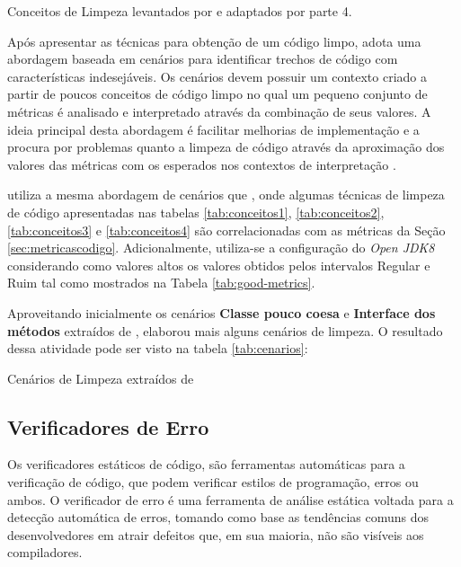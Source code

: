 \begin{table}[!ht]
\centering

\caption{Conceitos de Limpeza levantados por  e adaptados por  parte 4.} 
\label{tab:conceitos4}
\end{table}
\FloatBarrier

Após apresentar as técnicas para obtenção de um código limpo,    adota uma abordagem baseada em cenários para identificar trechos de código com características indesejáveis. Os cenários devem possuir um contexto criado a partir de poucos conceitos de código limpo no qual um pequeno conjunto de métricas é analisado e interpretado através da combinação de seus valores. A ideia principal desta abordagem é facilitar melhorias de implementação e a procura por problemas quanto a limpeza de código através da aproximação dos valores das métricas com os esperados nos contextos de interpretação \cite{Machini2010}.

 utiliza a mesma abordagem de cenários que , onde algumas técnicas de limpeza de código apresentadas nas tabelas \ref{tab:conceitos1}, \ref{tab:conceitos2}, \ref{tab:conceitos3} e \ref{tab:conceitos4} são correlacionadas com as métricas da Seção \ref{sec:metricascodigo}. Adicionalmente, utiliza-se a configuração do \textit{ Open JDK8 } considerando como valores altos os valores obtidos pelos intervalos Regular e Ruim tal como mostrados na Tabela \ref{tab:good-metrics}.

Aproveitando inicialmente os cenários \textbf{Classe pouco coesa} e \textbf{Interface dos métodos} extraídos de  ,  elaborou mais alguns cenários de limpeza. O resultado dessa atividade pode ser visto na tabela \ref{tab:cenarios}:



\begin{table}
\begin{table}[H]
\centering

\caption{Cenários de Limpeza extraídos de }
\label{tab:cenarios}
\end{table}
\FloatBarrier

\end{table} 

\pagebreak

\subsection{Verificadores de Erro}
\label{chap:verificadores}
Os verificadores estáticos de código, são ferramentas automáticas para a verificação de código, que podem verificar estilos de programação, erros ou ambos. O verificador de erro é uma ferramenta de análise estática voltada para a detecção automática de erros, tomando como base as tendências comuns dos desenvolvedores em atrair defeitos que, em sua maioria, não são visíveis aos compiladores. \cite{Louridas2006}

